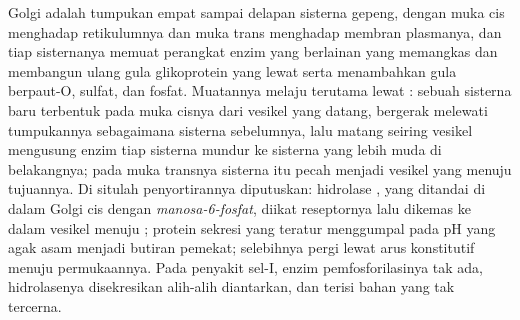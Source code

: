 \begin{proposition}[Golgi]\label{prop:b3:membrane-traffic:golgi}
Golgi adalah tumpukan empat sampai delapan sisterna gepeng, dengan muka cis
menghadap retikulumnya dan muka trans menghadap membran plasmanya, dan tiap
sisternanya memuat perangkat enzim yang berlainan yang memangkas dan membangun
ulang gula glikoprotein yang lewat serta menambahkan gula berpaut-O, sulfat,
dan fosfat. Muatannya melaju terutama lewat \emph{}: sebuah
sisterna baru terbentuk pada muka cisnya dari vesikel yang datang, bergerak
melewati tumpukannya sebagaimana sisterna sebelumnya, lalu matang seiring
vesikel  mengusung enzim tiap sisterna mundur ke sisterna yang lebih muda
di belakangnya; pada muka transnya sisterna itu pecah menjadi vesikel yang
menuju tujuannya. Di situlah penyortirannya diputuskan: hidrolase , yang
ditandai di dalam Golgi cis dengan \emph{manosa-6-fosfat}, diikat reseptornya
lalu dikemas ke dalam vesikel  menuju ; protein sekresi yang
teratur menggumpal pada pH yang agak asam menjadi butiran pemekat; selebihnya
pergi lewat arus konstitutif menuju permukaannya. Pada penyakit sel-I, enzim
pemfosforilasinya tak ada, hidrolasenya disekresikan alih-alih diantarkan, dan
 terisi bahan yang tak tercerna.
\end{proposition}

